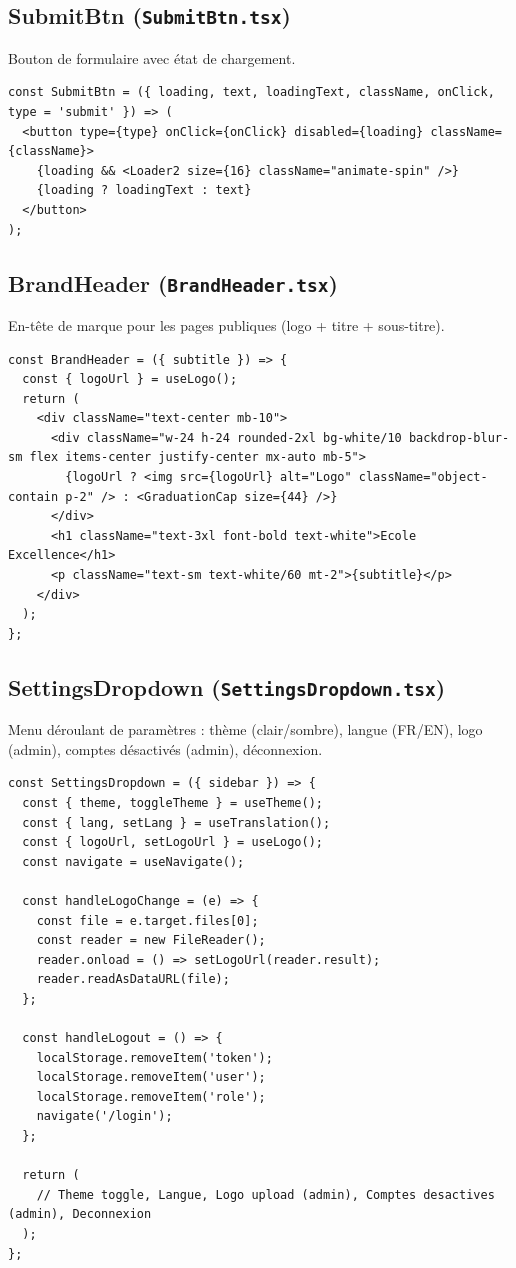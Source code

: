 \documentclass[12pt,a4paper]{article}
\begin{document}
\subsection{SubmitBtn (\texttt{SubmitBtn.tsx})}

Bouton de formulaire avec état de chargement.

\begin{lstlisting}[style=code]
const SubmitBtn = ({ loading, text, loadingText, className, onClick, type = 'submit' }) => (
  <button type={type} onClick={onClick} disabled={loading} className={className}>
    {loading && <Loader2 size={16} className="animate-spin" />}
    {loading ? loadingText : text}
  </button>
);
\end{lstlisting}

\subsection{BrandHeader (\texttt{BrandHeader.tsx})}

En-tête de marque pour les pages publiques (logo + titre + sous-titre).

\begin{lstlisting}[style=code]
const BrandHeader = ({ subtitle }) => {
  const { logoUrl } = useLogo();
  return (
    <div className="text-center mb-10">
      <div className="w-24 h-24 rounded-2xl bg-white/10 backdrop-blur-sm flex items-center justify-center mx-auto mb-5">
        {logoUrl ? <img src={logoUrl} alt="Logo" className="object-contain p-2" /> : <GraduationCap size={44} />}
      </div>
      <h1 className="text-3xl font-bold text-white">Ecole Excellence</h1>
      <p className="text-sm text-white/60 mt-2">{subtitle}</p>
    </div>
  );
};
\end{lstlisting}

\subsection{SettingsDropdown (\texttt{SettingsDropdown.tsx})}

Menu déroulant de paramètres : thème (clair/sombre), langue (FR/EN), logo (admin), comptes désactivés (admin), déconnexion.

\begin{lstlisting}[style=code]
const SettingsDropdown = ({ sidebar }) => {
  const { theme, toggleTheme } = useTheme();
  const { lang, setLang } = useTranslation();
  const { logoUrl, setLogoUrl } = useLogo();
  const navigate = useNavigate();

  const handleLogoChange = (e) => {
    const file = e.target.files[0];
    const reader = new FileReader();
    reader.onload = () => setLogoUrl(reader.result);
    reader.readAsDataURL(file);
  };

  const handleLogout = () => {
    localStorage.removeItem('token');
    localStorage.removeItem('user');
    localStorage.removeItem('role');
    navigate('/login');
  };

  return (
    // Theme toggle, Langue, Logo upload (admin), Comptes desactives (admin), Deconnexion
  );
};
\end{lstlisting}
\end{document}
